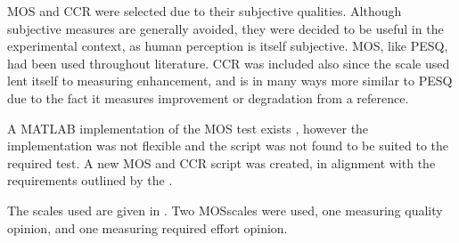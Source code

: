\ac{MOS} and \ac{CCR} were selected due to their subjective qualities.
Although subjective measures are generally avoided, they were decided
to be useful in the experimental context, as human perception is itself
subjective. \ac{MOS}, like \ac{PESQ}, had been used throughout literature.
\ac{CCR} was included also since the scale used lent itself to measuring
enhancement, and is in many ways more similar to \ac{PESQ} due to
the fact it measures improvement or degradation from a reference.

A MATLAB implementation of the \ac{MOS} test exists \citep{Ruzanski2009},
however the implementation was not flexible and the script was not
found to be suited to the required test. A new \ac{MOS} and \ac{CCR}
script was created, in alignment with the requirements outlined by
the \citet{InternationalTelecommunicationUnion1996}.

The scales used are given in . Two \ac{MOS}scales
were used, one measuring quality opinion, and one measuring required
effort opinion.


